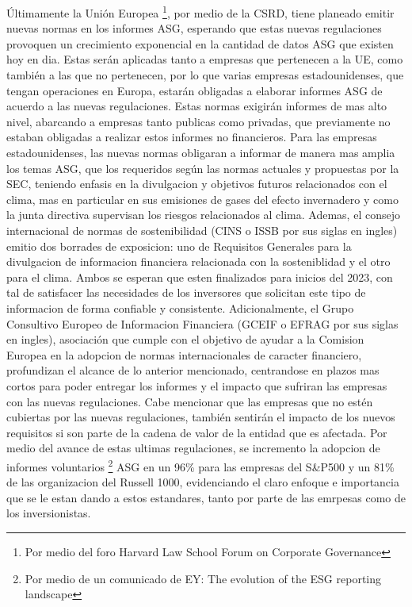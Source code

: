 \vspace{0.5cm}

Últimamente la Unión Europea \footnote{Por medio del foro Harvard Law School Forum on Corporate Governance}, por medio de la CSRD, tiene planeado emitir nuevas normas en los informes ASG, esperando que estas nuevas regulaciones provoquen un crecimiento exponencial en la cantidad de datos ASG que existen hoy en dia. Estas serán aplicadas tanto a empresas que pertenecen a la UE, como también a las que no pertenecen, por lo que varias empresas estadounidenses, que tengan operaciones en Europa, estarán obligadas a elaborar informes ASG de acuerdo a las nuevas regulaciones. Estas normas exigirán informes de mas alto nivel, abarcando a empresas tanto publicas como privadas, que previamente no estaban obligadas a realizar estos informes no financieros. Para las empresas estadounidenses, las nuevas normas obligaran a informar de manera mas amplia los temas ASG, que los requeridos según las normas actuales y propuestas por la SEC, teniendo enfasis en la divulgacion y objetivos futuros relacionados con el clima, mas en particular en sus emisiones de gases del efecto invernadero y como la junta directiva supervisan los riesgos relacionados al clima. Ademas, el consejo internacional de normas de sostenibilidad (CINS o ISSB por sus siglas en ingles) emitio dos borrades de exposicion: uno de Requisitos Generales para la divulgacion de informacion financiera relacionada con la sosteniblidad y el otro para el clima. Ambos se esperan que esten finalizados para inicios del 2023, con tal de satisfacer las necesidades de los inversores que solicitan este tipo de informacion de forma confiable y consistente. Adicionalmente, el Grupo Consultivo Europeo de Informacion Financiera (GCEIF o EFRAG por sus siglas en ingles), asociación que cumple con el objetivo de ayudar a la Comision Europea en la adopcion de normas internacionales de caracter financiero, profundizan el alcance de lo anterior mencionado, centrandose en plazos mas cortos para poder entregar los informes y  el impacto que sufriran las empresas con las nuevas regulaciones.  Cabe mencionar que las empresas que no estén cubiertas por las nuevas regulaciones, también sentirán el impacto de los nuevos requisitos si son parte de la cadena de valor de la entidad que es afectada. Por medio del avance de estas ultimas regulaciones, se incremento la adopcion de informes voluntarios \footnote{Por medio de un comunicado de EY: The evolution of the ESG reporting
landscape} ASG en un 96\% para las empresas del S\&P500 y un 81\% de las organizacion del Russell 1000, evidenciando el claro enfoque e importancia que se le estan dando a estos estandares, tanto por parte de las emrpesas como de los inversionistas.

